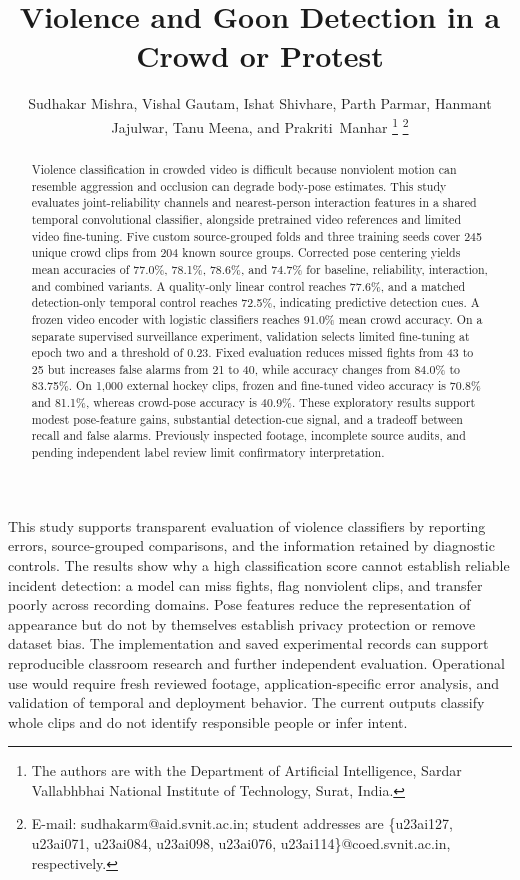 \documentclass[journal]{IEEEtai}
\begin{document}
\title{Violence and Goon Detection in a Crowd or Protest}
\author{Sudhakar Mishra, Vishal Gautam, Ishat Shivhare, Parth Parmar, Hanmant Jajulwar, Tanu Meena, and \mbox{Prakriti Manhar}
\thanks{The authors are with the Department of Artificial Intelligence, Sardar Vallabhbhai National Institute of Technology, Surat, India.}
\thanks{E-mail: sudhakarm@aid.svnit.ac.in; student addresses are \{u23ai127, u23ai071, u23ai084, u23ai098, u23ai076, u23ai114\}@coed.svnit.ac.in, respectively.}}
\markboth{}{}
\maketitle
\begin{abstract}
Violence classification in crowded video is difficult because nonviolent motion can resemble aggression and occlusion can degrade body-pose estimates. This study evaluates joint-reliability channels and nearest-person interaction features in a shared temporal convolutional classifier, alongside pretrained video references and limited video fine-tuning. Five custom source-grouped folds and three training seeds cover 245 unique crowd clips from 204 known source groups. Corrected pose centering yields mean accuracies of 77.0\%, 78.1\%, 78.6\%, and 74.7\% for baseline, reliability, interaction, and combined variants. A quality-only linear control reaches 77.6\%, and a matched detection-only temporal control reaches 72.5\%, indicating predictive detection cues. A frozen video encoder with logistic classifiers reaches 91.0\% mean crowd accuracy. On a separate supervised surveillance experiment, validation selects limited fine-tuning at epoch two and a threshold of 0.23. Fixed evaluation reduces missed fights from 43 to 25 but increases false alarms from 21 to 40, while accuracy changes from 84.0\% to 83.75\%. On 1,000 external hockey clips, frozen and fine-tuned video accuracy is 70.8\% and 81.1\%, whereas crowd-pose accuracy is 40.9\%. These exploratory results support modest pose-feature gains, substantial detection-cue signal, and a tradeoff between recall and false alarms. Previously inspected footage, incomplete source audits, and pending independent label review limit confirmatory interpretation.
\end{abstract}
\begin{IEEEImpStatement}
This study supports transparent evaluation of violence classifiers by reporting errors, source-grouped comparisons, and the information retained by diagnostic controls. The results show why a high classification score cannot establish reliable incident detection: a model can miss fights, flag nonviolent clips, and transfer poorly across recording domains. Pose features reduce the representation of appearance but do not by themselves establish privacy protection or remove dataset bias. The implementation and saved experimental records can support reproducible classroom research and further independent evaluation. Operational use would require fresh reviewed footage, application-specific error analysis, and validation of temporal and deployment behavior. The current outputs classify whole clips and do not identify responsible people or infer intent.
\end{IEEEImpStatement}
\end{document}
